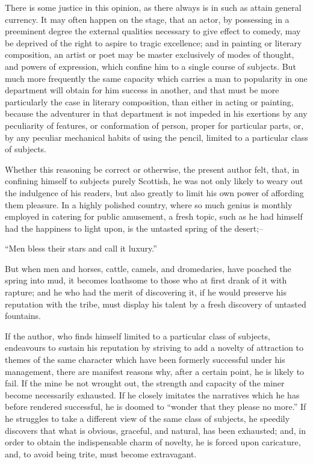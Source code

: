 There is some justice in this opinion, as there always is in such as
attain general currency. It may often happen on the stage, that an
actor, by possessing in a preeminent degree the external qualities
necessary to give effect to comedy, may be deprived of the right to
aspire to tragic excellence; and in painting or literary composition, an
artist or poet may be master exclusively of modes of thought, and powers
of expression, which confine him to a single course of subjects. But
much more frequently the same capacity which carries a man to popularity
in one department will obtain for him success in another, and that must
be more particularly the case in literary composition, than either in
acting or painting, because the adventurer in that department is not
impeded in his exertions by any peculiarity of features, or conformation
of person, proper for particular parts, or, by any peculiar mechanical
habits of using the pencil, limited to a particular class of subjects.

Whether this reasoning be correct or otherwise, the present author felt,
that, in confining himself to subjects purely Scottish, he was not only
likely to weary out the indulgence of his readers, but also greatly to
limit his own power of affording them pleasure. In a highly polished
country, where so much genius is monthly employed in catering for public
amusement, a fresh topic, such as he had himself had the happiness to
light upon, is the untasted spring of the desert;--

``Men bless their stars and call it luxury.''

But when men and horses, cattle, camels, and dromedaries, have poached
the spring into mud, it becomes loathsome to those who at first drank of
it with rapture; and he who had the merit of discovering it, if he would
preserve his reputation with the tribe, must display his talent by a
fresh discovery of untasted fountains.

If the author, who finds himself limited to a particular class of
subjects, endeavours to sustain his reputation by striving to add a
novelty of attraction to themes of the same character which have been
formerly successful under his management, there are manifest reasons
why, after a certain point, he is likely to fail. If the mine be not
wrought out, the strength and capacity of the miner become necessarily
exhausted. If he closely imitates the narratives which he has before
rendered successful, he is doomed to ``wonder that they please no
more.'' If he struggles to take a different view of the same class of
subjects, he speedily discovers that what is obvious, graceful, and
natural, has been exhausted; and, in order to obtain the indispensable
charm of novelty, he is forced upon caricature, and, to avoid being
trite, must become extravagant.


